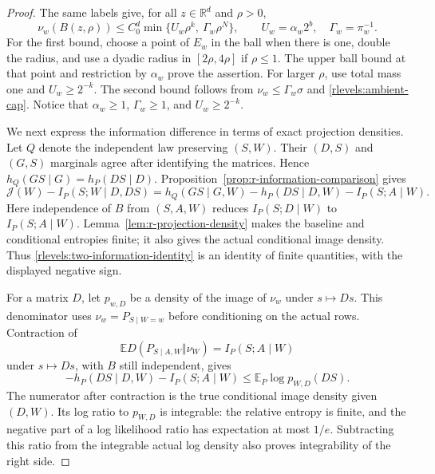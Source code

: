 \begin{proof}
The same labels give, for all \(z\in\mathbb R^d\) and \(\rho>0\),
\begin{equation}\label{rlevels:two-two-powers}
 \nu_w(B(z,\rho))
 \le C_0^d\min\{U_w\rho^k,\ \Gamma_w\rho^N\},
 \qquad U_w=\alpha_w2^b,\quad \Gamma_w=\pi_w^{-1}.
\end{equation}
For the first bound, choose a point of \(E_w\) in the ball when
there is one, double the radius, and use a dyadic radius in
\([2\rho,4\rho]\) if \(\rho\le1\).  The upper ball bound at that
point and restriction by \(\alpha_w\) prove the assertion.  For
larger \(\rho\), use total mass one and \(U_w\ge2^{-k}\).
The second bound follows from \(\nu_w\le\Gamma_w\sigma\) and
\eqref{rlevels:ambient-cap}.  Notice that \(\alpha_w\ge1\),
\(\Gamma_w\ge1\), and \(U_w\ge2^{-k}\).

We next express the information difference in terms of exact projection
densities.  Let \(Q\) denote the independent
law preserving \((S,W)\).  Their \((D,S)\) and \((G,S)\)
marginals agree after identifying the matrices.  Hence
\(h_Q(GS\mid G)=h_P(DS\mid D)\).
Proposition~\ref{prop:r-information-comparison} gives
\begin{equation}\label{rlevels:two-information-identity}
 \mathcal J(W)-I_P(S;W\mid D,DS)
 =h_Q(GS\mid G,W)-h_P(DS\mid D,W)-I_P(S;A\mid W).
\end{equation}
Here independence of \(B\) from \((S,A,W)\) reduces
\(I_P(S;D\mid W)\) to \(I_P(S;A\mid W)\).
Lemma~\ref{lem:r-projection-density} makes the baseline
and conditional entropies finite; it also gives the actual conditional
image density.  Thus \eqref{rlevels:two-information-identity} is an
identity of finite quantities, with the displayed negative sign.

For a matrix \(D\), let \(p_{w,D}\) be a density of the image of
\(\nu_w\) under \(s\mapsto Ds\).  This denominator uses
\(\nu_w=P_{S\mid W=w}\) before conditioning on the actual rows.
Contraction of
\[
 \mathbb E D(P_{S\mid A,W}\Vert\nu_W)=I_P(S;A\mid W)
\]
under \(s\mapsto Ds\), with \(B\) still independent, gives
\begin{equation}\label{rlevels:two-cross-entropy}
 -h_P(DS\mid D,W)-I_P(S;A\mid W)
 \le \mathbb E_P\log p_{W,D}(DS).
\end{equation}
The numerator after contraction is the true conditional image density
given \((D,W)\).  Its log ratio to \(p_{W,D}\) is integrable:
the relative entropy is finite, and the negative part of a log
likelihood ratio has expectation at most \(1/e\).  Subtracting this
ratio from the integrable actual log density also proves integrability
of the right side.


\end{proof}
